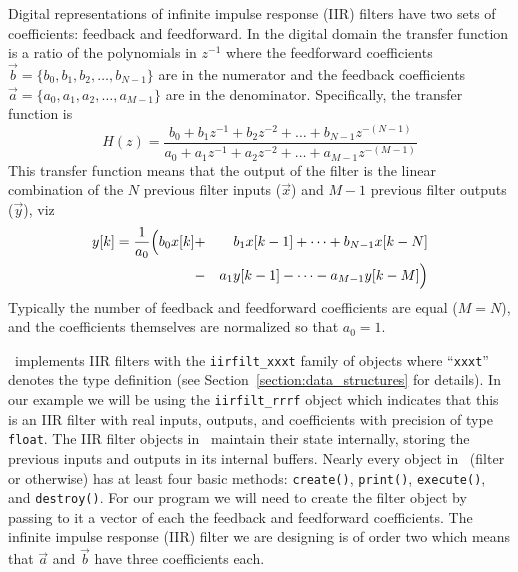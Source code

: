 Digital representations of infinite impulse response (IIR) filters have
two sets of coefficients: feedback and feedforward.
In the digital domain the transfer function is a ratio of the
polynomials in $z^{-1}$ where the feedforward coefficients
$\vec{b} = \{b_0, b_1, b_2, \ldots, b_{N-1}\}$
are in the numerator and the feedback coefficients
$\vec{a} = \{a_0, a_1, a_2, \ldots, a_{M-1}\}$
are in the denominator.
Specifically, the transfer function is
%
\begin{equation}
    H(z) =
        \frac{
            b_0 + b_1 z^{-1} + b_2 z^{-2} + \ldots + b_{N-1}z^{-(N-1)}
        }{
            a_0 + a_1 z^{-1} + a_2 z^{-2} + \ldots + a_{M-1}z^{-(M-1)}
        }
\end{equation}
%
This transfer function means that the output of the filter is the linear
combination of the $N$ previous filter inputs
($\vec{x}$)
and $M-1$ previous filter outputs
($\vec{y}$),
viz
%
\begin{eqnarray}
    y[k] =
        \frac{1}{a_0}
        \Bigl(
            b_0 x[k] &+& b_1 x[k-1] + \cdots + b_{N-1} x[k-N]\\
                     &-& a_1 y[k-1] - \cdots - a_{M-1} y[k-M]
        \Bigr)
\end{eqnarray}
%
Typically the number of feedback and feedforward coefficients are equal
($M=N$), and the coefficients themselves are normalized so that $a_0=1$.

\liquid\ implements IIR filters with the {\tt iirfilt\_xxxt} family of
objects where ``{\tt xxxt}'' denotes the type definition
(see Section~\ref{section:data_structures} for details).
In our example we will be using the {\tt iirfilt\_rrrf} object which
indicates that this is an IIR filter with real inputs, outputs, and
coefficients with precision of type {\tt float}.
The IIR filter objects in \liquid\ maintain their state
internally, storing the previous inputs and outputs in its internal
buffers.
Nearly every object in \liquid\ (filter or otherwise) has at least four
basic methods:
{\tt create()},
{\tt print()},
{\tt execute()}, and
{\tt destroy()}.
For our program we will need to create the filter object by passing to
it a vector of each the feedback and feedforward coefficients.
The infinite impulse response (IIR) filter we are designing is of order
two which means that $\vec{a}$ and $\vec{b}$ have three coefficients
each.

